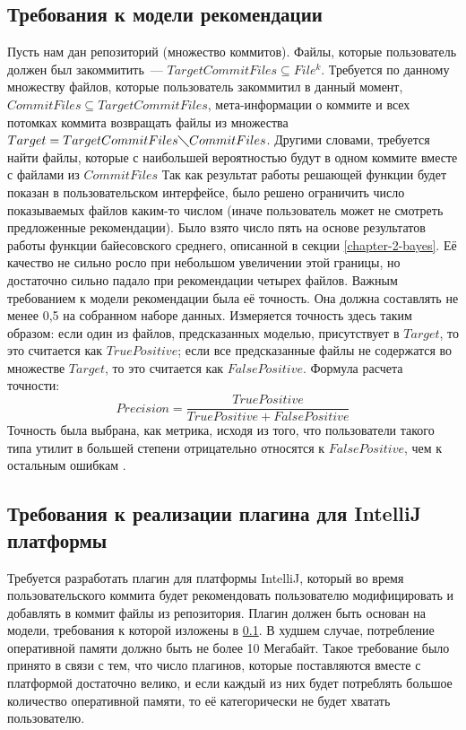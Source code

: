 \subsection{Требования к модели рекомендации}\label{ml-model-req}
Пусть нам дан репозиторий (множество коммитов). Файлы, которые пользователь должен был закоммитить~--- $TargetCommitFiles \subseteq File^k$. Требуется по данному множеству файлов, которые пользователь закоммитил в данный момент, $CommitFiles \subseteq TargetCommitFiles$, мета-информации о коммите и всех потомках коммита возвращать файлы из множества $Target = TargetCommitFiles \diagdown CommitFiles$. Другими словами, требуется найти файлы, которые с наибольшей вероятностью будут в одном коммите вместе с файлами из $CommitFiles$ Так как результат работы решающей функции будет показан в пользовательском интерфейсе, было решено ограничить число показываемых файлов каким-то числом (иначе пользователь может не смотреть предложенные рекомендации). Было взято число пять на основе результатов работы функции байесовского среднего, описанной в секции \ref{chapter-2-bayes}. Её качество не сильно росло при небольшом увеличении этой границы, но достаточно сильно падало при рекомендации четырех файлов. Важным требованием к модели рекомендации была её точность. Она должна составлять не менее 0,5 на собранном наборе данных. Измеряется точность здесь таким образом: если один из файлов, предсказанных моделью, присутствует в $Target$, то это считается как $True Positive$; если все предсказанные файлы не содержатся во множестве $Target$, то это считается как $False Positive$. Формула расчета точности:
    $$Precision = \frac{True Positive}{True Positive + False Positive}$$
Точность была выбрана, как метрика, исходя из того, что пользователи такого типа утилит в большей степени отрицательно относятся к $False Positive$, чем к остальным ошибкам \cite{microsoft-false-positive}.
\subsection{Требования к реализации плагина для IntelliJ платформы}\label{impl-req}
Требуется разработать плагин для платформы IntelliJ, который во время пользовательского коммита будет рекомендовать пользователю модифицировать и добавлять в коммит файлы из репозитория. Плагин должен быть основан на модели, требования к которой изложены в \ref{ml-model-req}. В худшем случае, потребление оперативной памяти должно быть не более 10 Мегабайт. Такое требование было принято в связи с тем, что число плагинов, которые поставляются вместе с платформой достаточно велико, и если каждый из них будет потреблять большое количество оперативной памяти, то её категорически не будет хватать пользователю.

